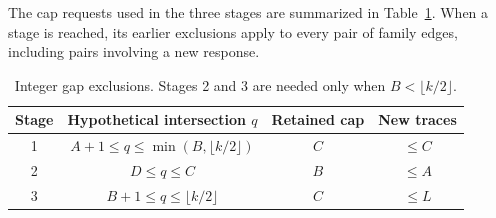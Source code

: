 \documentclass[11pt]{article}
\numberwithin{equation}{section}
\theoremstyle{definition}
\theoremstyle{remark}
\begin{document}
The cap requests used in the three stages are summarized in
Table~\ref{tab:gaps}. When a stage is reached, its earlier exclusions
apply to every pair of family edges, including pairs involving a new
response.
\begin{table}[ht]
\centering
\begin{tabular}{cccc}
\toprule
Stage & Hypothetical intersection $q$ & Retained cap & New traces\\
\midrule
1 & $A+1\le q\le\min(B,\lfloor k/2\rfloor)$ & $C$ & $\le C$\\
2 & $D\le q\le C$ & $B$ & $\le A$\\
3 & $B+1\le q\le\lfloor k/2\rfloor$ & $C$ & $\le L$\\
\bottomrule
\end{tabular}
\caption{Integer gap exclusions. Stages 2 and 3 are needed only when
$B<\lfloor k/2\rfloor$.}\label{tab:gaps}
\end{table}
\end{document}
